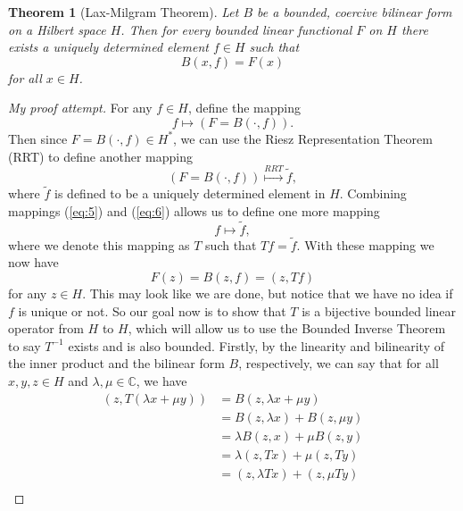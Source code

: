 \documentclass[11pt]{article}
\newtheorem{theorem}{Theorem}
\theoremstyle{definition}
\begin{document}
\begin{theorem}[Lax-Milgram Theorem]
	Let $B$ be a bounded, coercive bilinear form on a Hilbert space $H$. Then for every bounded linear functional $F$ on $H$
	there exists a uniquely determined element $f\in H$ such that
	\begin{equation*}
		B(x,f) = F(x)
	\end{equation*}
	for all $x \in H$.
\end{theorem}
\begin{proof}[My proof attempt]
	For any $f \in H$, define the mapping 
	\begin{equation}
		\label{eq:5}
		f \mapsto (F = B(\cdot, f)).
	\end{equation}
	Then since $F = B(\cdot, f) \in H^*$, we can use the Riesz Representation Theorem (RRT) to  define another mapping
	\begin{equation}
		\label{eq:6}
		(F = B(\cdot,f)) \stackrel{RRT}{\mapsto} \tilde{f},
	\end{equation}
	where $\tilde{f}$ is defined to be a uniquely determined element in $H$.
	Combining mappings (\ref{eq:5}) and (\ref{eq:6}) allows us to define one more mapping
	\begin{equation}
		\label{eq:7}
		f \mapsto \tilde{f},
	\end{equation}
	where we denote this mapping as $T$ such that $Tf = \tilde{f}$.
	With these mapping we now have
	\begin{equation*}
		F(z) = B(z,f) = (z,Tf)
	\end{equation*}
	for any $z \in H$.
	This may look like we are done, but notice that we have no idea if $f$ is unique or not.
	So our goal now is to show that $T$ is a bijective bounded linear operator from $H$ to $H$,
	which will allow us to use the Bounded Inverse Theorem to say $T^{-1}$ exists and is also bounded.
	Firstly, by the linearity and bilinearity of the inner product and the bilinear form $B$, respectively,
	we can say that for all $x,y,z \in H$ and $\lambda, \mu \in \mathbb{C}$, we have
	\begin{equation*}
		\begin{aligned}
			(z,T(\lambda x + \mu y)) &= B(z, \lambda x + \mu y) \\
						 &= B(z,\lambda x) + B(z, \mu y) \\
						 &= \lambda B(z,x) + \mu B(z,y) \\
						 &= \lambda (z,Tx) + \mu (z,Ty) \\
						 &= (z,\lambda Tx) + (z, \mu Ty) \\

\end{aligned}
\end{equation*}
\end{proof}
\end{document}
